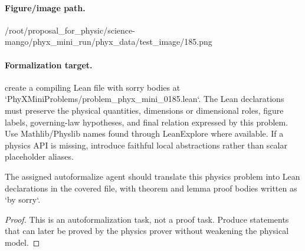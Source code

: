 \paragraph{Figure/image path.}
/root/proposal\_for\_physic/science-mango/phyx\_mini\_run/phyx\_data/test\_image/185.png

\paragraph{Formalization target.}
create a compiling Lean file with sorry bodies at `PhyXMiniProblems/problem\_phyx\_mini\_0185.lean`. The Lean declarations must preserve the physical quantities, dimensions or dimensional roles, figure labels, governing-law hypotheses, and final relation expressed by this problem.
Use Mathlib/Physlib names found through LeanExplore where available. If a physics API is missing, introduce faithful local abstractions rather than scalar placeholder aliases.

\begin{theorem}
\label{thm:physics:phyx_mini_0185:target}
The assigned autoformalize agent should translate this physics problem into Lean declarations in the covered file, with theorem and lemma proof bodies written as `by sorry`.
\end{theorem}
\begin{proof}
This is an autoformalization task, not a proof task. Produce statements that can later be proved by the physics prover without weakening the physical model.
\end{proof}

